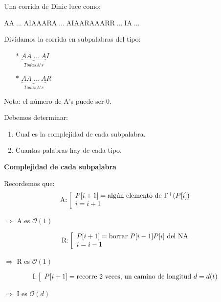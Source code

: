 \documentclass[12pt,a4paper]{report}
\begin{document}
		Una corrida de Dinic luce como:
		\begin{center}
			AA$\; \dotsc \;$AIAAARA$\; \dotsc \;$AIAARAAARR$\; \dotsc \;$IA$\; \dotsc \;$
		\end{center}

		Dividamos la corrida en subpalabras del tipo:
		\begin{center}
			\begin{itemize}
				\item[$*$] $\underbrace{AA \; \dotsc \; A}_{Todas A's}I$
				\item[$*$] $\underbrace{AA \; \dotsc \; A}_{Todas A's}R$
			\end{itemize}
		\end{center}

		Nota: el número de A's puede ser 0.

		Debemos determinar:
		\begin{enumerate}
			\item Cual es la complejidad de cada subpalabra.
			\item Cuantas palabras hay de cada tipo.
		\end{enumerate}

		\textbf{Complejidad de cada subpalabra}

		Recordemos que:
		\begin{equation*}
			\textup{A:}
  			\left[
  			\begin{array}{l}
    		 P[i+1] = \textup{algún elemento de } \Gamma^{+}(P[i]) \\
     		 i = i+1\\
  			\end{array}
  			\right.
		\end{equation*}
		\begin{center}
			$\Rightarrow$ A es $\mathcal{O}(1)$
		\end{center}

		\begin{equation*}
			\textup{R:}
  			\left[
  			\begin{array}{l}
    		 P[i+1] = \textup{borrar } P[i-1]P[i] \textup{ del NA} \\
     		 i = i-1\\
  			\end{array}
  			\right.
		\end{equation*}
		\begin{center}
			$\Rightarrow$ R es $\mathcal{O}(1)$
		\end{center}

		\begin{equation*}
			\textup{I:}
  			\left[
  			\begin{array}{l}
    		 P[i+1] = \textup{recorre 2 veces, un camino de longitud } d = d(t)
  			\end{array}
  			\right.
		\end{equation*}
		\begin{center}
			$\Rightarrow$ I es $\mathcal{O}(d)$
		\end{center}
\end{document}
